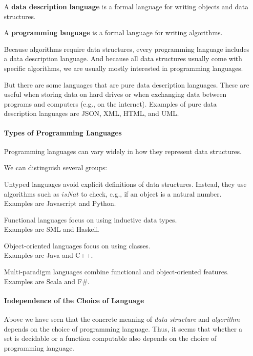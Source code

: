 \begin{definition}[Languages]
A \textbf{data description language} is a formal language for writing objects and data structures.

A \textbf{programming language} is a formal language for writing algorithms.
\end{definition}

Because algorithms require data structures, every programming language includes a data description language.
And because all data structures usually come with specific algorithms, we are usually mostly interested in programming languages.

But there are some languages that are pure data description languages.
These are useful when storing data on hard drives or when exchanging data between programs and computers (e.g., on the internet).
Examples of pure data description languages are JSON, XML, HTML, and UML.

\paragraph{Types of Programming Languages}
Programming languages can vary widely in how they represent data structures.

We can distinguish several groups:
\begin{compactitem}
\item Untyped languages avoid explicit definitions of data structures.
Instead, they use algorithms such as $\mathit{isNat}$ to check, e.g., if an object is a natural number.\\
Examples are Javascript and Python.
\item Functional languages focus on using inductive data types.\\
Examples are SML and Haskell.
\item Object-oriented languages focus on using classes.\\
Examples are Java and C++.
\item Multi-paradigm languages combine functional and object-oriented features.\\
Examples are Scala and F\#.
\end{compactitem}


\paragraph{Independence of the Choice of Language}
Above we have seen that the concrete meaning of \emph{data structure} and \emph{algorithm} depends on the choice of programming language.
Thus, it seems that whether a set is decidable or a function computable also depends on the choice of programming language.


